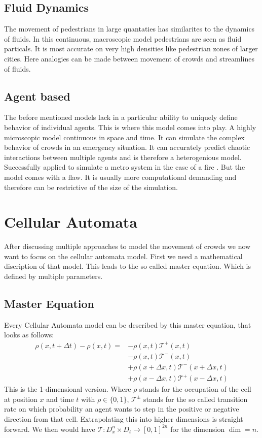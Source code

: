 \subsection{Fluid Dynamics}
The movement of pedestrians in large quantaties has similarites to the dynamics of fluids. 
In this continuous, macroscopic model pedestrians are seen as fluid particals. 
It is most accurate on very high densities like pedestrian zones of larger cities. 
Here analogies can be made between movement of crowds and streamlines of fluids.

\subsection{Agent based}
The before mentioned models lack in a particular ability to uniquely define behavior of individual agents. 
This is where this model comes into play. 
A highly microscopic model continuous in space and time. 
It can simulate the complex behavior of crowds in an emergency situation. 
It can accurately predict chaotic interactions between multiple agents and is therefore a heterogenious model. 
Successfully applied to simulate a metro system in the case of a fire \cite{zarboutis2004searching}.
But the model comes with a flaw. 
It is usually more computational demanding and therefore can be restrictive of the size of the simulation. 


\newpage
\section{Cellular Automata}
After discussing multiple approaches to model the movement of crowds we now want to focus on the cellular automata model. 
First we need a mathematical discription of that model. This leads to the so called master equation. 
Which is defined by multiple parameters\cite{Michi}.

\subsection{Master Equation}
Every Cellular Automata model can be described by this master equation, that looks as follows: 
\begin{equation}
   \label{eq:eq1}
   \begin{split}
   \rho(x,t+\Delta t) - \rho(x,t)  = & - \rho(x,t)\mathcal{T}^{+}(x,t) 
   \\ & - \rho(x,t)\mathcal{T}^{-}(x,t) 
   \\ & + \rho(x +\Delta x,t)\mathcal{T}^{-}(x + \Delta x,t)
   \\ & + \rho(x -\Delta x,t)\mathcal{T}^{+}(x - \Delta x,t) 
   \end{split}
\end{equation}
This is the 1-dimensional version. Where $\rho$ stands for the occupation of the cell at position $ x $ and time $ t $ with $\rho \in \{0,1\} $, 
$ \mathcal{T}^{\pm}$ stands for the so called transition rate on which probability an agent wants to step in the positive or negative direction from that cell.
Extrapolating this into higher dimensions is straight forward. We then would have $ \mathcal{T}: D_x^{n}\times D_t \to [0,1]^{2n} $ for the dimension $\dim = n$.


